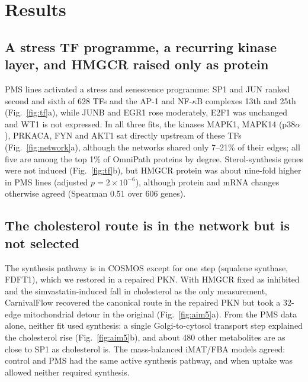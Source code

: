 \documentclass[11pt, a4paper]{article}
\begin{document}
\section{Results}

\subsection{A stress TF programme, a recurring kinase layer, and HMGCR raised only as protein}
PMS lines activated a stress and senescence programme: SP1 and JUN ranked second and sixth of 628
TFs and the AP-1 and NF-$\kappa$B complexes 13th and 25th (Fig.~\ref{fig:tf}a), while JUNB and EGR1
rose moderately, E2F1 was unchanged and WT1 is not expressed. In all three fits, the kinases MAPK1,
MAPK14 (p38$\alpha$), PRKACA, FYN and AKT1 sat directly upstream of these TFs
(Fig.~\ref{fig:network}a), although the networks shared only 7--21\% of their edges; all five are
among the top 1\% of OmniPath proteins by degree. Sterol-synthesis genes were not induced
(Fig.~\ref{fig:tf}b), but HMGCR protein was about nine-fold higher in PMS lines (adjusted
$p=2\times10^{-6}$), although protein and mRNA changes otherwise agreed (Spearman 0.51 over 606
genes).

\subsection{The cholesterol route is in the network but is not selected}
The synthesis pathway is in COSMOS except for one step (squalene synthase, FDFT1), which we
restored in a repaired PKN. With HMGCR fixed as inhibited and the simvastatin-induced fall in
cholesterol as the only measurement, CarnivalFlow recovered the canonical route in the repaired PKN
but took a 32-edge mitochondrial detour in the original (Fig.~\ref{fig:aim5}a). From the PMS data
alone, neither fit used synthesis: a single Golgi-to-cytosol transport step explained the
cholesterol rise (Fig.~\ref{fig:aim5}b), and about 480 other metabolites are as close to SP1 as
cholesterol is. The mass-balanced iMAT/FBA models agreed: control and PMS had the same active
synthesis pathway, and when uptake was allowed neither required synthesis.
\end{document}
